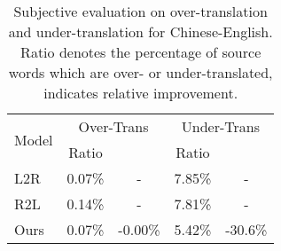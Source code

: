 \documentclass[11pt,a4paper]{article}
\begin{document}
\begin{CJK*}{UTF8}{gbsn}
\begin{table}
	\setlength{\belowcaptionskip}{-0.2cm}
	\centering
	\begin{tabular}{l|c|c|c|c}
		\hline
		\multirow{2}{*}{Model}    &   \multicolumn{2}{c|}{Over-Trans}  &   \multicolumn{2}{c}{Under-Trans} \\ \cline{2-5}
		&    Ratio   &      &    Ratio   &    \\
		\hline
L2R   &     0.07\%       &   -   & 7.85\%      &  -   \\
		R2L   &      0.14\%       &  -   & 7.81\%       & -   \\
		Ours  &   0.07\%     &  -0.00\%    &  5.42\%    &   -30.6\%  \\
		\hline
	\end{tabular}
	\caption{Subjective evaluation on over-translation and under-translation for Chinese-English.
		Ratio denotes the percentage of source words which are over- or under-translated,  indicates relative improvement.} \label{sub-evaluation}
\end{table}


\end{CJK*}
\end{document}
